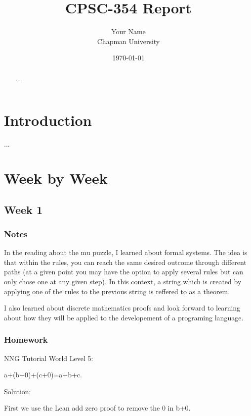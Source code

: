\documentclass{article}
\title{CPSC-354 Report}
\author{Your Name  \\ Chapman University}
\date{\today}
\theoremstyle{theorem}
\theoremstyle{definition}
\theoremstyle{remark}
\begin{document}
\maketitle

\begin{abstract}
...
\end{abstract}

\setcounter{tocdepth}{3}
\tableofcontents

\section{Introduction}\label{intro}

...

\section{Week by Week}\label{homework}

\subsection{Week 1}



\subsubsection*{Notes}

In the reading about the mu puzzle, I learned about formal systems. The idea is that within the rules, you can reach the same desired outcome through different paths (at a given point you may have the option to apply several rules but can only chose one at any given step). In this context, a string which is created by applying one of the rules to the previous string is reffered to as a theorem. 

I also learned about discrete mathematics proofs and look forward to learning about how they will be applied to the developement of a programing language.

\subsubsection*{Homework}

NNG Tutorial World Level 5:

a+(b+0)+(c+0)=a+b+c.

Solution: 

First we use the Lean add zero proof to remove the 0 in b+0.
\end{document}
